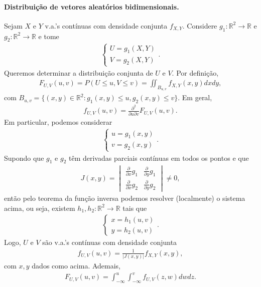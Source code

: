 \documentclass[../Notas.tex]{subfiles}
\begin{document}
\paragraph{Distribuição de vetores aleatórios bidimensionais.} Sejam $X$ e $Y$ v.a.'s contínuas com densidade conjunta $f_{X,Y}$. Considere $g_1:\mathbb{R}^2\to\mathbb{R}$ e $g_2:\mathbb{R}^2\to\mathbb{R}$ e tome
\begin{align*}
    \begin{cases}
    U = g_1(X,Y) \\
    V = g_2(X,Y)
    \end{cases}.
\end{align*}
Queremos determinar a distribuição conjunta de $U$ e $V$. Por definição,
\begin{align*}
    F_{U,V}(u,v) = P(U\leq u, V\leq v) = \iint_{B_{u,v}} f_{X,Y}(x,y) dxdy,
\end{align*}
com $B_{u,v} = \{ (x,y)\in\mathbb{R}^2 : g_1(x,y)\leq u, g_2(x,y)\leq v \}$. Em geral,
\begin{align*}
    f_{U,V}(u,v) = \frac{\partial^2}{\partial u\partial v} F_{U,V}(u,v).
\end{align*}
Em particular, podemos considerar
\begin{align*}
    \begin{cases}
    u = g_1(x,y) \\
    v = g_2(x,y)
    \end{cases}.
\end{align*}
Supondo que $g_1$ e $g_2$ têm derivadas parciais contínuas em todos os pontos e que
\begin{align*}
    J(x,y) = \begin{vmatrix}
    \frac{\partial}{\partial x} g_1 & \frac{\partial}{\partial y} g_1 \\
    \frac{\partial}{\partial x} g_2 & \frac{\partial}{\partial y} g_2
    \end{vmatrix}\neq 0,
\end{align*}
então pelo teorema da função inversa podemos resolver (localmente) o sistema acima, ou seja, existem $h_1, h_2:\mathbb{R}^2\to\mathbb{R}$ tais que
\begin{align*}
    \begin{cases}
    x = h_1(u,v) \\
    y = h_2(u,v)
    \end{cases}.
\end{align*}
Logo, $U$ e $V$ são v.a.'s contínuas com densidade conjunta
\begin{align*}
    f_{U,V}(u,v) = \frac{1}{|J(x,y)|}f_{X,Y}(x,y),
\end{align*}
com $x,y$ dados como acima. Ademais,
\begin{align*}
    F_{U,V}(u,v) = \int_{-\infty}^u\int_{-\infty}^v f_{U,V}(z,w) dwdz.
\end{align*}
\end{document}
